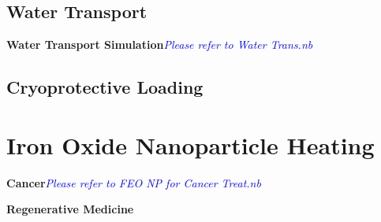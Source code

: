 \begin{appendices}
\subsection{Water Transport}
\begin{example}
\textbf{Water Transport Simulation}\textcolor{blue} {\emph{Please refer to Water Trans.nb}}
\end{example}
\subsection{Cryoprotective Loading}


\section{Iron Oxide Nanoparticle Heating}

\begin{example}
\textbf{Cancer}\textcolor{blue} {\emph{Please refer to FEO NP for Cancer Treat.nb}}
\end{example}

\begin{example}
\textbf{Regenerative Medicine}
\end{example}

\end{appendices}

